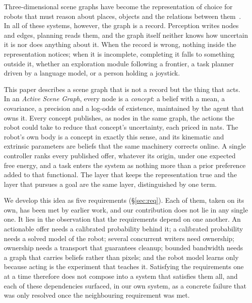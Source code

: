 \documentclass[10pt,twocolumn]{IEEEtran}
\newcommand{\nats}{nats}
\begin{document}
Three-dimensional scene graphs have become the representation of choice for robots that must reason
about places, objects and the relations between
them~\cite{armeni20193dscenegraphstructure,rosinol20203ddynamicscenegraphs,hughes2022hydra,gu2023conceptgraphsopenvocabulary3dscene}.
In all of these systems, however, the graph is a record. Perception writes nodes and edges, planning
reads them, and the graph itself neither knows how uncertain it is nor does anything about it. When
the record is wrong, nothing inside the representation notices; when it is incomplete, completing it
falls to something outside it, whether an exploration module following a frontier, a task planner
driven by a language model, or a person holding a joystick.

This paper describes a scene graph that is not a record but the thing that acts. In an
\emph{Active Scene Graph}, every node is a \emph{concept}: a belief with a mean, a covariance, a
precision and a log-odds of existence, maintained by the agent that owns it. Every concept publishes,
as nodes in the same graph, the actions the robot could take to reduce that concept's uncertainty,
each priced in \nats. The robot's own body is a concept in exactly this sense, and its kinematic and
extrinsic parameters are beliefs that the same machinery corrects online. A single controller ranks
every published offer, whatever its origin, under one expected free energy, and a task enters the
system as nothing more than a prior preference added to that functional. The layer that keeps the
representation true and the layer that pursues a goal are the same layer, distinguished by one term.

We develop this idea as five requirements (\S\ref{sec:req}). Each of them, taken on its own, has
been met by earlier work, and our contribution does not lie in any single one. It lies in the
observation that the requirements depend on one another. An actionable offer needs a calibrated
probability behind it; a calibrated probability needs a solved model of the robot; several
concurrent writers need ownership; ownership needs a transport that guarantees cleanup; bounded
bandwidth needs a graph that carries beliefs rather than pixels; and the robot model learns only
because acting is the experiment that teaches it. Satisfying the requirements one at a time
therefore does not compose into a system that satisfies them all, and each of these dependencies
surfaced, in our own system, as a concrete failure that was only resolved once the neighbouring
requirement was met.
\end{document}
